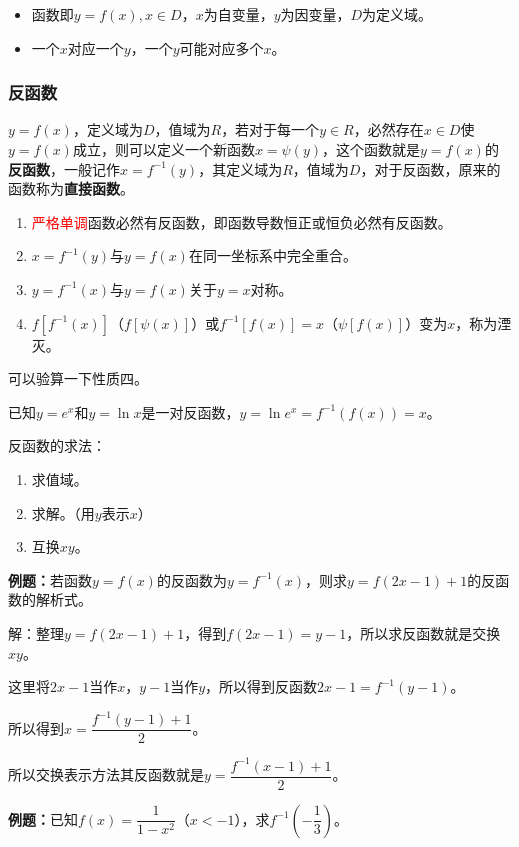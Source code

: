 \documentclass[UTF8, 12pt]{ctexart}
\begin{document}
\begin{itemize}
    \item 函数即$y=f(x),x\in D$，$x$为自变量，$y$为因变量，$D$为定义域。
    \item 一个$x$对应一个$y$，一个$y$可能对应多个$x$。
\end{itemize}
\subsubsection{反函数}

$y=f(x)$，定义域为$D$，值域为$R$，若对于每一个$y\in R$，必然存在$x\in D$使$y=f(x)$成立，则可以定义一个新函数$x=\psi(y)$，这个函数就是$y=f(x)$的\textbf{反函数}，一般记作$x=f^{-1}(y)$，其定义域为$R$，值域为$D$，对于反函数，原来的函数称为\textbf{直接函数}。
\begin{enumerate}
    \item \textcolor{red}{严格单调}函数必然有反函数，即函数导数恒正或恒负必然有反函数。
    \item $x=f^{-1}(y)$与$y=f(x)$在同一坐标系中完全重合。
    \item $y=f^{-1}(x)$与$y=f(x)$关于$y=x$对称。
    \item $f[f^{-1}(x)]$（$f[\psi(x)]$）或$f^{-1}[f(x)]=x$（$\psi[f(x)]$）变为$x$，称为湮灭。
\end{enumerate}

可以验算一下性质四。

已知$y=e^x$和$y=\ln x$是一对反函数，$y=\ln e^x=f^{-1}(f(x))=x$。

反函数的求法：

\begin{enumerate}
    \item 求值域。
    \item 求解。（用$y$表示$x$）
    \item 互换$xy$。
\end{enumerate}

\textbf{例题：}若函数$y=f(x)$的反函数为$y=f^{-1}(x)$，则求$y=f(2x-1)+1$的反函数的解析式。

解：整理$y=f(2x-1)+1$，得到$f(2x-1)=y-1$，所以求反函数就是交换$xy$。

这里将$2x-1$当作$x$，$y-1$当作$y$，所以得到反函数$2x-1=f^{-1}(y-1)$。

所以得到$x=\dfrac{f^{-1}(y-1)+1}{2}$。

所以交换表示方法其反函数就是$y=\dfrac{f^{-1}(x-1)+1}{2}$。

\textbf{例题：}已知$f(x)=\dfrac{1}{1-x^2}$（$x<-1$），求$f^{-1}(-\dfrac{1}{3})$。
\end{document}
